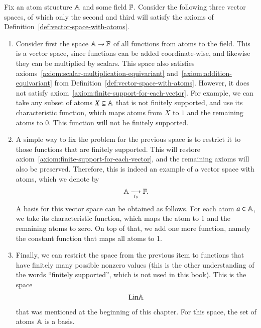 \begin{myexample}
    \label{ex:linear-combinations-of-atoms}
        Fix an  atom structure $\mathbb A$ and some field $\mathbb F$. Consider the following three vector spaces, of which only the second and third will satisfy the axioms of Definition~\ref{def:vector-space-with-atoms}.
        \begin{enumerate}
            \item Consider first the space $\mathbb A \to \mathbb F$ of all functions from atoms to the field. This is a vector space, since functions can be added coordinate-wise, and likewise they can be multiplied by scalars. This space also satisfies axioms~\ref{axiom:scalar-multiplication-equivariant} and~\ref{axiom:addition-equivariant} from Definition~\ref{def:vector-space-with-atoms}. However, it does not satisfy axiom~\ref{axiom:finite-support-for-each-vector}. For example, we can take any subset of atoms $X \subseteq \mathbb A$ that is not finitely supported, and use its characteristic function, which maps atoms from $X$ to $1$ and the remaining atoms to $0$. This function will not be finitely supported.
            \item \label{item:fs-fun-example-atoms} A simple way to fix the problem for the previous space is to restrict it to those functions that are finitely supported. This will restore axiom~\ref{axiom:finite-support-for-each-vector}, and the remaining axioms will also be preserved. Therefore, this is indeed an example of a vector space with atoms, which we denote by 
            \begin{align*}
            \mathbb A \underset{\text{fs}}{\longrightarrow} \mathbb F.
            \end{align*}
            A basis for this vector space can be obtained as follows. For each atom $a \in \mathbb A$, we take its characteristic function, which maps the atom to 1 and the remaining atoms to zero. On top of that, we add one more function, namely the constant function that maps all atoms to 1. 
            \item Finally, we can restrict the space from the previous item to functions that have finitely many possible nonzero values (this is the other understanding of the words ``finitely supported'', which is not used in this book). This is the space 
            \begin{align*}
            \mathrm{Lin} \mathbb A
            \end{align*}
            that was mentioned at the beginning of this chapter. 
            For this space, the set of atoms $\mathbb A$ is a basis.
        \end{enumerate}
\end{myexample}

